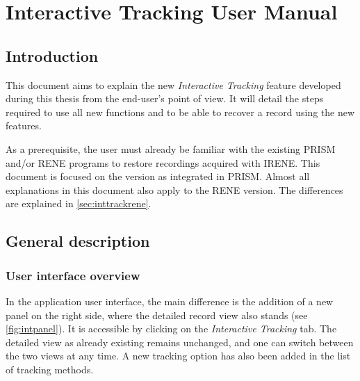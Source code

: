 
\chapter{Interactive Tracking User Manual}
\label{chap:usermanint}

\section{Introduction}

This document aims to explain the new \emph{Interactive Tracking} feature developed during this thesis from the end-user's point of view. It will detail the steps required to use all new functions and to be able to recover a record using the new features.

As a prerequisite, the user must already be familiar with the existing PRISM and/or RENE programs to restore recordings acquired with IRENE. This document is focused on the version as integrated in PRISM. Almost all explanations in this document also apply to the RENE version. The differences are explained in \autoref{sec:inttrackrene}.

\section{General description}

\subsection{User interface overview}

In the application user interface, the main difference is the addition of a new panel on the right side, where the detailed record view also stands (see \autoref{fig:intpanel}). It is accessible by clicking on the \emph{Interactive Tracking} tab. The detailed view as already existing remains unchanged, and one can switch between the two views at any time. A new tracking option has also been added in the list of tracking methods.

